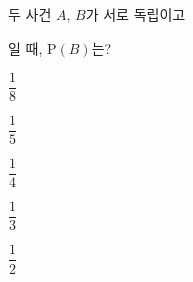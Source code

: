 두 사건 $A$, $B$가 서로 독립이고 \par\smallskip{}\par\smallskip\noindent 일 때, $\mathrm{P}(B)$는?
\begin{choices32}{\rule[-3ex]{0pt}{8ex}$\dfrac{1}{8}$}{\rule[-3ex]{0pt}{8ex}$\dfrac{1}{5}$}{\rule[-3ex]{0pt}{8ex}$\dfrac{1}{4}$}{\rule[-3ex]{0pt}{8ex}$\dfrac{1}{3}$}{\rule[-3ex]{0pt}{8ex}$\dfrac{1}{2}$}\end{choices32}
